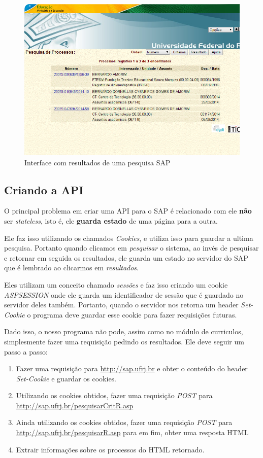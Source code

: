 \begin{figure}[!hp]
  \centering
    \includegraphics[width=\textwidth]{sap_results.png}
  \caption{Interface com resultados de uma pesquisa SAP}
  \label{fig:sap_results}
\end{figure}

\subsection{Criando a API}

O principal problema em criar uma API para o SAP é relacionado com ele \textbf{não} ser \textit{stateless}, isto é, ele \textbf{guarda estado} de uma página para a outra.

Ele faz isso utilizando os chamados \textit{Cookies}, e utiliza isso para guardar a ultima pesquisa. Portanto quando clicamos em \textit{pesquisar} o sistema, ao invés de pesquisar e retornar em seguida os resultados, ele guarda um estado no servidor do SAP que é lembrado ao clicarmos em \textit{resultados}.

Eles utilizam um conceito chamado \textit{sessões} e faz isso criando um cookie \textit{ASPSESSION} onde ele guarda um identificador de sessão que é guardado no servidor deles também. Portanto, quando o servidor nos retorna um header \textit{Set-Cookie} o programa deve guardar esse cookie para fazer requisições futuras.

Dado isso, o nosso programa não pode, assim como no módulo de curriculos, simplesmente fazer uma requisição pedindo os resultados. Ele deve seguir um passo a passo:

\begin{enumerate}
  \item Fazer uma requisição para \url{http://sap.ufrj.br} e obter o conteúdo do header \textit{Set-Cookie} e guardar os cookies.
  \item Utilizando os cookies obtidos, fazer uma requisição \textit{POST} para \url{http://sap.ufrj.br/pesquisarCritR.asp}
  \item Ainda utilizando os cookies obtidos, fazer uma requisição \textit{POST} para \url{http://sap.ufrj.br/pesquisarR.asp} para em fim, obter uma resposta HTML
  \item Extrair informações sobre os processos do HTML retornado.
\end{enumerate}

